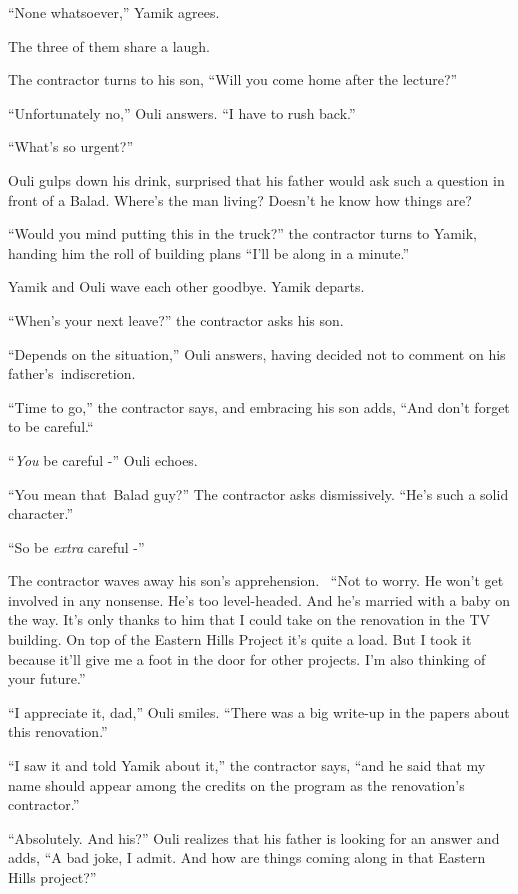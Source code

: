\documentclass[twoside,11pt]{book}
\begin{document}
``None whatsoever,'' Yamik agrees. 

The three of them share a laugh. 

The contractor turns to his son, ``Will you come home after the lecture?'' 

``Unfortunately no,'' Ouli answers. ``I have to rush back.'' 

``What's so urgent?'' 

Ouli gulps down his drink, surprised that his father would ask such a question in front of a Balad. Where's the man
living? Doesn't he know how things are?\ \ 

{}``Would you mind putting this in the truck?'' the contractor turns to Yamik, handing him the roll of building plans
``I{}'ll be along in a minute.''

Yamik and Ouli wave each other goodbye. Yamik departs.

``When's your next leave?'' the contractor asks his son. 

``Depends on the situation,'' Ouli answers, having decided not to comment on his
father{}'s\ indiscretion.

``Time to go,'' the contractor says, and embracing his son adds, ``And don't
forget to be careful.``\ 

``\textit{You} be careful -'' Ouli echoes. 

``You mean that\ Balad guy?'' The contractor asks dismissively. ``He's such a
solid character.'' 

``So be \textit{extra} careful -'' 

The contractor waves away his son's apprehension.~ ``Not to worry. He won't get involved in any nonsense.
He's too level-headed. And he's married with a baby on the way. It's only thanks to him that I could take on the
renovation in the TV building. On top of the Eastern Hills Project it's quite a load. But I took it because it'll give
me a foot in the door for other projects. I'm also thinking of your future.'' 

``I appreciate it, dad,'' Ouli smiles. ``There was a big write-up in the papers
about this renovation.'' 

``I saw it and told Yamik about it,'' the contractor says, ``and he said that my
name should appear among the credits on the program as the renovation's contractor.'' \ 

``Absolutely. And his?'' Ouli realizes that his father is looking for an answer and adds,
``A bad joke, I admit. And how are things coming along in that Eastern Hills project?'' 
\end{document}
